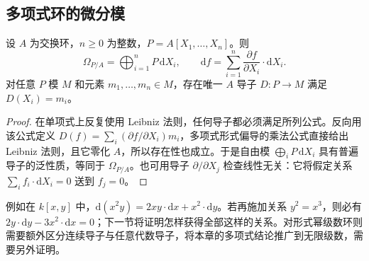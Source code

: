 \subsection{多项式环的微分模}
\label{b3:subsec:1401:03}

\begin{proposition}\label{b3:prop:polynomial-differentials}
	设 \(A\) 为交换环，\(n\ge0\) 为整数，\(P=A[X_1,\ldots,X_n]\)。则
	\[
		\Omega_{P/A}=\bigoplus_{i=1}^nP\,\mathrm{d}X_i, \qquad \mathrm{d}f=\sum_{i=1}^n\dfrac{\partial f}{\partial X_i}\cdot\mathrm{d}X_i.
	\]
	对任意 \(P\) 模 \(M\) 和元素 \(m_1,\ldots,m_n\in M\)，存在唯一 \(A\) 导子 \(D:P\rightarrow M\) 满足 \(D(X_i)=m_i\)。
\end{proposition}
\begin{proof}
	在单项式上反复使用 Leibniz 法则，任何导子都必须满足所列公式。反向用该公式定义 \(D(f)=\sum_i(\partial f/\partial X_i)m_i\)，多项式形式偏导的乘法公式直接给出 Leibniz 法则，且它零化 \(A\)，所以存在性也成立。于是自由模 \(\bigoplus_iP\,\mathrm{d}X_i\) 具有普遍导子的泛性质，等同于 \(\Omega_{P/A}\)。也可用导子 \(\partial/\partial X_j\) 检查线性无关：它将假定关系 \(\sum_if_i\cdot\mathrm{d}X_i=0\) 送到 \(f_j=0\)。
\end{proof}

例如在 \(k[x,y]\) 中，\(\mathrm{d}(x^2y)=2xy\cdot\mathrm{d}x+x^2\cdot\mathrm{d}y\)。若再施加关系 \(y^2=x^3\)，则必有 \(2y\cdot\mathrm{d}y-3x^2\cdot\mathrm{d}x=0\)；下一节将证明怎样获得全部这样的关系。对形式幂级数环则需要额外区分连续导子与任意代数导子，将本章的多项式结论推广到无限级数，需要另外证明。
